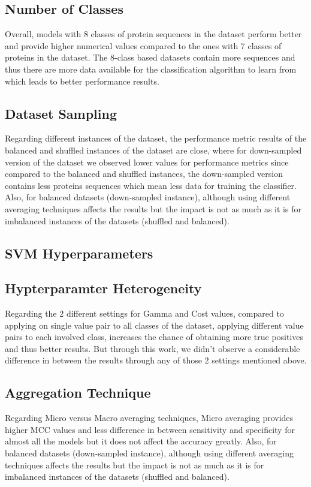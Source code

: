 \subsection{Number of Classes}
Overall, models with 8 classes of protein sequences in the dataset perform better and provide higher numerical values 
compared to the ones with 7 classes of proteins in the dataset. The 8-class based datasets contain more sequences and 
thus there are more data available for the classification algorithm to learn from which leads to better performance results.

\subsection{Dataset Sampling}
Regarding different instances of the dataset, the performance metric results of the balanced and shuffled 
instances of the dataset are close, where for down-sampled version of the dataset we observed lower 
values for performance metrics since compared to the balanced and shuffled instances, the down-sampled version 
contains less proteins sequences which mean less data for training the classifier.
Also, for balanced datasets (down-sampled instance), although using different averaging techniques affects the results
but the impact  is not as much as it is for imbalanced instances of the datasets (shuffled and balanced).


\subsection{SVM Hyperparameters}
\subsection{Hypterparamter Heterogeneity}
Regarding the 2 different settings for Gamma and Cost values, compared to applying on single value pair to all classes 
of the dataset, applying different value pairs to each involved class, increases the chance of obtaining more true 
positives and thus better results. But through this work, we didn’t observe a considerable difference in between the 
results through any of those 2 settings mentioned above.

\subsection{Aggregation Technique}
Regarding Micro versus Macro averaging techniques, Micro averaging provides higher MCC values and less difference in between 
sensitivity and specificity for almost all the models but it does not affect the accuracy greatly. Also, for balanced 
datasets (down-sampled instance), although using different averaging techniques affects the results but the impact 
is not as much as it is for imbalanced instances of the datasets (shuffled and balanced).

